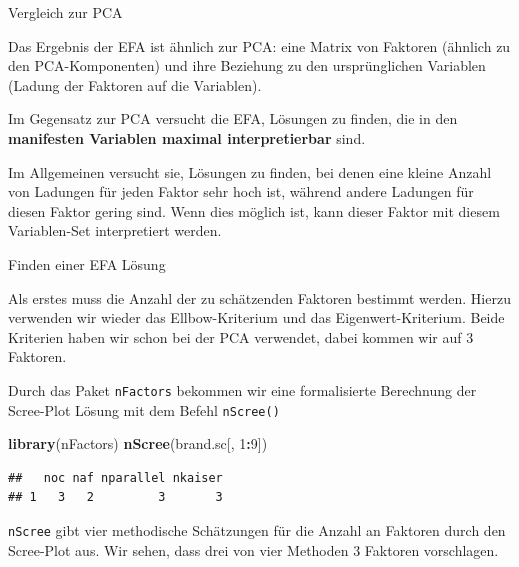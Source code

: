 \documentclass[12pt,ngerman,a4paper,ignorenonframetext,]{beamer}
\newenvironment{Shaded}{\begin{snugshade}}{\end{snugshade}}
\newcommand{\DecValTok}[1]{\textcolor[rgb]{0.00,0.00,0.81}{#1}}
\newcommand{\KeywordTok}[1]{\textcolor[rgb]{0.13,0.29,0.53}{\textbf{#1}}}
\newcommand{\NormalTok}[1]{#1}
\newcommand{\OperatorTok}[1]{\textcolor[rgb]{0.81,0.36,0.00}{\textbf{#1}}}
\begin{document}
\begin{frame}{Vergleich zur PCA}
\protect\hypertarget{vergleich-zur-pca}{}

Das Ergebnis der EFA ist ähnlich zur PCA: eine Matrix von Faktoren
(ähnlich zu den PCA-Komponenten) und ihre Beziehung zu den
ursprünglichen Variablen (Ladung der Faktoren auf die Variablen).

Im Gegensatz zur PCA versucht die EFA, Lösungen zu finden, die in den
\textbf{manifesten Variablen maximal interpretierbar} sind.

Im Allgemeinen versucht sie, Lösungen zu finden, bei denen eine kleine
Anzahl von Ladungen für jeden Faktor sehr hoch ist, während andere
Ladungen für diesen Faktor gering sind. Wenn dies möglich ist, kann
dieser Faktor mit diesem Variablen-Set interpretiert werden.

\end{frame}

\begin{frame}[fragile]{Finden einer EFA Lösung}
\protect\hypertarget{finden-einer-efa-losung}{}

Als erstes muss die Anzahl der zu schätzenden Faktoren bestimmt werden.
Hierzu verwenden wir wieder das Ellbow-Kriterium und das
Eigenwert-Kriterium. Beide Kriterien haben wir schon bei der PCA
verwendet, dabei kommen wir auf 3 Faktoren.

Durch das Paket \texttt{nFactors} bekommen wir eine formalisierte
Berechnung der Scree-Plot Lösung mit dem Befehl \texttt{nScree()}

\begin{Shaded}
\begin{Highlighting}[]
\KeywordTok{library}\NormalTok{(nFactors)}
\KeywordTok{nScree}\NormalTok{(brand.sc[, }\DecValTok{1}\OperatorTok{:}\DecValTok{9}\NormalTok{])}
\end{Highlighting}
\end{Shaded}

\begin{verbatim}
##   noc naf nparallel nkaiser
## 1   3   2         3       3
\end{verbatim}

\texttt{nScree} gibt vier methodische Schätzungen für die Anzahl an
Faktoren durch den Scree-Plot aus. Wir sehen, dass drei von vier
Methoden 3 Faktoren vorschlagen.

\end{frame}
\end{document}
